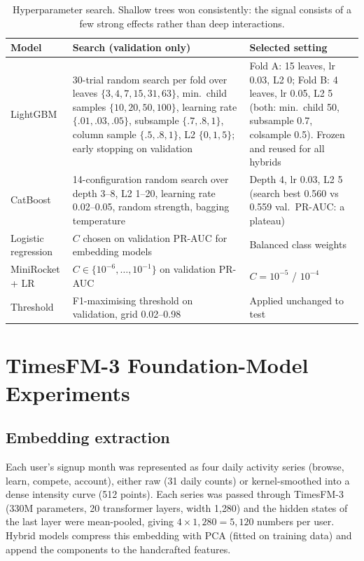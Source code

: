 \documentclass[11pt,a4paper]{article}
\begin{document}
\begin{table}[H]
\centering\small
\begin{tabularx}{\linewidth}{lXX}
\toprule
Model & Search (validation only) & Selected setting\\
\midrule
LightGBM & 30-trial random search per fold over leaves $\{3,4,7,15,31,63\}$, min.\ child samples $\{10,20,50,100\}$, learning rate $\{.01,.03,.05\}$, subsample $\{.7,.8,1\}$, column sample $\{.5,.8,1\}$, L2 $\{0,1,5\}$; early stopping on validation & Fold A: 15 leaves, lr 0.03, L2 0; Fold B: 4 leaves, lr 0.05, L2 5 (both: min.\ child 50, subsample 0.7, colsample 0.5). Frozen and reused for all hybrids\\
CatBoost & 14-configuration random search over depth 3--8, L2 1--20, learning rate 0.02--0.05, random strength, bagging temperature & Depth 4, lr 0.03, L2 5 (search best 0.560 vs 0.559 val.\ PR-AUC: a plateau)\\
Logistic regression & $C$ chosen on validation PR-AUC for embedding models & Balanced class weights\\
MiniRocket + LR & $C\in\{10^{-6},\dots,10^{-1}\}$ on validation PR-AUC & $C=10^{-5}$ / $10^{-4}$\\
Threshold & F1-maximising threshold on validation, grid 0.02--0.98 & Applied unchanged to test\\
\bottomrule
\end{tabularx}
\caption{Hyperparameter search. Shallow trees won consistently: the signal consists of a few strong effects rather than deep interactions.}
\label{tab:hparams}
\end{table}

\section{TimesFM-3 Foundation-Model Experiments}
\subsection{Embedding extraction}
Each user's signup month was represented as four daily activity series (browse, learn, compete, account),
either raw (31 daily counts) or kernel-smoothed into a dense intensity curve (512 points). Each series was
passed through TimesFM-3 (330M parameters, 20 transformer layers, width 1{,}280) and the hidden states of the
last layer were mean-pooled, giving $4\times1{,}280=5{,}120$ numbers per user. Hybrid models compress this
embedding with PCA (fitted on training data) and append the components to the handcrafted features.
\end{document}
